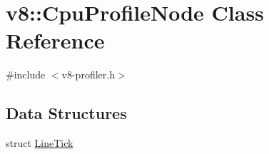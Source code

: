 \hypertarget{classv8_1_1CpuProfileNode}{}\section{v8\+:\+:Cpu\+Profile\+Node Class Reference}
\label{classv8_1_1CpuProfileNode}


{\ttfamily \#include $<$v8-\/profiler.\+h$>$}

\subsection*{Data Structures}
\begin{DoxyCompactItemize}
\item 
struct \hyperlink{structv8_1_1CpuProfileNode_1_1LineTick}{Line\+Tick}
\end{DoxyCompactItemize}
